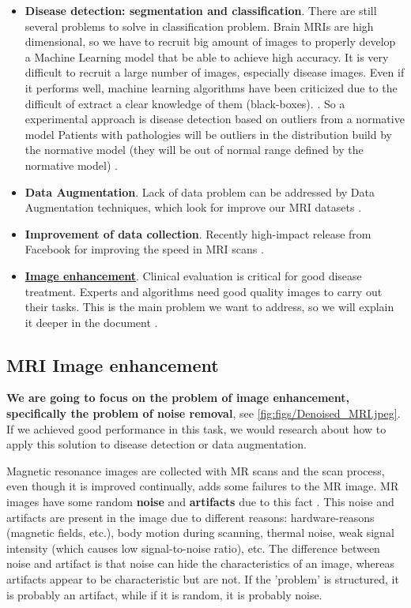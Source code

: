 \begin{itemize}
    \item \textbf{Disease detection: segmentation and classification}. There are still several problems to solve in classification problem. Brain MRIs are high dimensional, so we have to recruit big amount of images to properly develop a Machine Learning model that be able to achieve high accuracy. It is very difficult to recruit a large number of images, especially disease images. Even if it performs well, machine learning algorithms have been criticized due to the difficult of extract a clear knowledge of them (black-boxes).  \cite{myronenko20183d}. So a experimental approach is disease detection based on outliers from a normative model Patients with pathologies will be outliers in the distribution build by the normative model (they will be out of normal range defined by the normative model) \cite{marquand2016normative} \cite{mourao2011outlier}.
    \item \textbf{Data Augmentation}. Lack of data problem can be addressed by Data Augmentation techniques, which look for improve our MRI datasets \cite{GanDataAugment2018}.
    \item \textbf{Improvement of data collection}. Recently high-impact  release from Facebook for improving the speed in MRI scans \cite{fastmri}.
    \item \underline{\textbf{Image enhancement}}. Clinical evaluation is critical for good disease treatment. Experts and algorithms need good quality images to carry out their tasks. This is the main problem we want to address, so we will explain it deeper in the document \cite{tamada2020review} \cite{myronenko20183d}. 
\end{itemize}

\subsection{MRI Image enhancement}

\textbf{We are going to focus on the problem of image enhancement, specifically the problem of noise removal}, see \ref{fig:figs/Denoised_MRI.jpeg}. If we achieved good performance in this task, we would research about how to apply this solution to disease detection or data augmentation.


Magnetic resonance images are collected with MR scans and the scan process, even though it is improved continually, adds some failures to the MR image. MR images have some random \textbf{noise} and \textbf{artifacts} due to this fact \cite{artifacts86}. This noise and artifacts are present in the image due to different reasons: hardware-reasons (magnetic fields, etc.), body motion during scanning, thermal noise, weak signal intensity (which causes low signal-to-noise ratio), etc. The difference between noise and artifact is that noise can hide the characteristics of an image, whereas artifacts appear to be characteristic but are not. If the 'problem' is structured, it is probably an artifact, while if it is random, it is probably noise.

